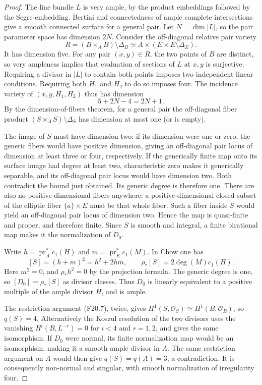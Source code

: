 \documentclass[11pt]{article}
\theoremstyle{remark}\newtheorem{remark}[theorem]{Remark}
\begin{document}
\begin{proof}
The line bundle $L$ is very ample, by the product
embeddings followed by the Segre embedding.  Bertini
and connectedness of ample complete intersections
give a smooth connected surface for a general pair.
Let $N=\dim|L|$, so the pair parameter space has
dimension $2N$.  Consider the off-diagonal relative
pair variety
\[
 R=(B\times_A B)\setminus\Delta_B
                \simeq A\times(E\times E\setminus\Delta_E).
 \tag{F21.2}
\]
It has dimension five.  For any pair $(x,y)\in R$,
the two points of $B$ are distinct, so very ampleness
implies that evaluation of sections of $L$ at $x,y$
is surjective.  Requiring a divisor in $|L|$ to
contain both points imposes two independent linear
conditions.  Requiring both $H_1$ and $H_2$ to do
so imposes four.  The incidence variety of
$(x,y,H_1,H_2)$ thus has dimension
\[
                              5+2N-4=2N+1.
 \tag{F21.3}
\]
By the dimension-of-fibers theorem, for a general
pair the off-diagonal fiber product
$(S\times_A S)\setminus\Delta_S$ has dimension at
most one (or is empty).

The image of $S$ must have dimension two: if its
dimension were one or zero, the generic fibers
would have positive dimension, giving an
off-diagonal pair locus of dimension at least
three or four, respectively.  If the generically
finite map onto its surface image had degree at
least two, characteristic zero makes it generically
separable, and its off-diagonal pair locus would
have dimension two.  Both contradict the bound
just obtained.  Its generic degree is therefore one.
There are also no positive-dimensional fibers
anywhere: a positive-dimensional closed subset of
the elliptic fiber $\{a\}\times E$ must be that
whole fiber.  Such a fiber inside $S$ would yield
an off-diagonal pair locus of dimension two.
Hence the map is quasi-finite and proper, and
therefore finite.  Since $S$ is smooth and integral,
a finite birational map makes it the normalization
of $D_0$.

Write $h=\operatorname{pr}_A^*c_1(H)$ and
$m=\operatorname{pr}_E^*c_1(M)$.  In Chow one has
\[
 [S]=(h+m)^2=h^2+2hm,\qquad
 \rho_*[S]=2\deg(M)c_1(H).
 \tag{F21.4}
\]
Here $m^2=0$, and $\rho_*h^2=0$ by the projection
formula.  The generic degree is one, so
$[D_0]=\rho_*[S]$ as divisor classes.  Thus $D_0$
is linearly equivalent to a positive multiple of
the ample divisor $H$, and is ample.

The restriction argument (F20.7), twice, gives
$H^1(S,\mathcal O_S)\simeq H^1(B,\mathcal O_B)$,
so $q(S)=4$.  Alternatively the Koszul resolution
of the two divisors uses the vanishing
$H^i(B,L^{-r})=0$ for $i<4$ and $r=1,2$, and
gives the same isomorphism.
If $D_0$ were normal, its finite normalization
map would be an isomorphism, making it a smooth
ample divisor in $A$.  The same restriction
argument on $A$ would then give $q(S)=q(A)=3$,
a contradiction.  It is consequently non-normal
and singular, with smooth normalization of
irregularity four.


\end{proof}
\end{document}
